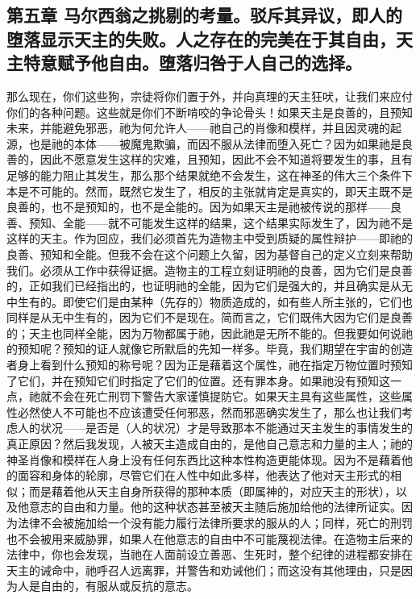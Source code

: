 
\subsection{第五章 马尔西翁之挑剔的考量。驳斥其异议，即人的堕落显示天主的失败。人之存在的完美在于其自由，天主特意赋予他自由。堕落归咎于人自己的选择。}

那么现在，你们这些狗，宗徒将你们置于外，并向真理的天主狂吠，让我们来应付你们的各种问题。这些就是你们不断啃咬的争论骨头！如果天主是良善的，且预知未来，并能避免邪恶，祂为何允许人——祂自己的肖像和模样，并且因灵魂的起源，也是祂的本体——被魔鬼欺骗，而因不服从法律而堕入死亡？因为如果祂是良善的，因此不愿意发生这样的灾难，且预知，因此不会不知道将要发生的事，且有足够的能力阻止其发生，那么那个结果就绝不会发生，这在神圣的伟大三个条件下本是不可能的。然而，既然它发生了，相反的主张就肯定是真实的，即天主既不是良善的，也不是预知的，也不是全能的。因为如果天主是祂被传说的那样——良善、预知、全能——就不可能发生这样的结果，这个结果实际发生了，因为祂不是这样的天主。作为回应，我们必须首先为造物主中受到质疑的属性辩护——即祂的良善、预知和全能。但我不会在这个问题上久留，因为基督自己的定义立刻来帮助我们。必须从工作中获得证据。造物主的工程立刻证明祂的良善，因为它们是良善的，正如我们已经指出的，也证明祂的全能，因为它们是强大的，并且确实是从无中生有的。即使它们是由某种（先存的）物质造成的，如有些人所主张的，它们也同样是从无中生有的，因为它们不是现在。简而言之，它们既伟大因为它们是良善的；天主也同样全能，因为万物都属于祂，因此祂是无所不能的。但我要如何说祂的预知呢？预知的证人就像它所默启的先知一样多。毕竟，我们期望在宇宙的创造者身上看到什么预知的称号呢？因为正是藉着这个属性，祂在指定万物位置时预知了它们，并在预知它们时指定了它们的位置。还有罪本身。如果祂没有预知这一点，祂就不会在死亡刑罚下警告大家谨慎提防它。如果天主具有这些属性，这些属性必然使人不可能也不应该遭受任何邪恶，然而邪恶确实发生了，那么也让我们考虑人的状况——是否是（人的状况）才是导致那本不能通过天主发生的事情发生的真正原因？然后我发现，人被天主造成自由的，是他自己意志和力量的主人；祂的神圣肖像和模样在人身上没有任何东西比这种本性构造更能体现。因为不是藉着他的面容和身体的轮廓，尽管它们在人性中如此多样，他表达了他对天主形式的相似；而是藉着他从天主自身所获得的那种本质（即属神的，对应天主的形状），以及他意志的自由和力量。他的这种状态甚至被天主随后施加给他的法律所证实。因为法律不会被施加给一个没有能力履行法律所要求的服从的人；同样，死亡的刑罚也不会被用来威胁罪，如果人在他意志的自由中不可能蔑视法律。在造物主后来的法律中，你也会发现，当祂在人面前设立善恶、生死时，整个纪律的进程都安排在天主的诫命中，祂呼召人远离罪，并警告和劝诫他们；而这没有其他理由，只是因为人是自由的，有服从或反抗的意志。\par

